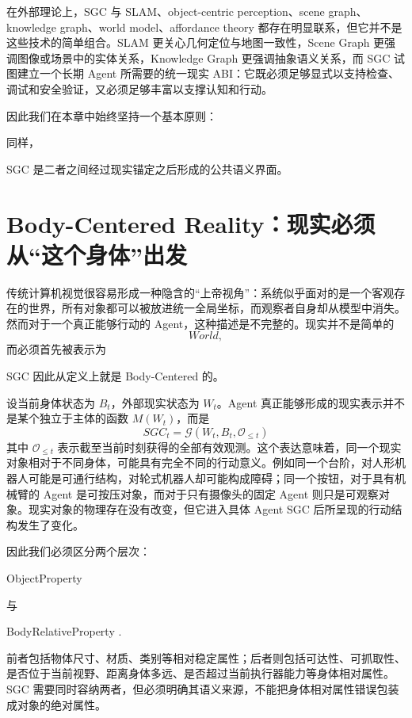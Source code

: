 在外部理论上，SGC 与 SLAM、object-centric perception、scene graph、knowledge graph、world model、affordance theory 都存在明显联系，但它并不是这些技术的简单组合。SLAM 更关心几何定位与地图一致性，Scene Graph 更强调图像或场景中的实体关系，Knowledge Graph 更强调抽象语义关系，而 SGC 试图建立一个长期 Agent 所需要的统一现实 ABI：它既必须足够显式以支持检查、调试和安全验证，又必须足够丰富以支撑认知和行动。

因此我们在本章中始终坚持一个基本原则：
\begin{statementbox}
\centering
{}
\end{statementbox}
同样，
\begin{statementbox}
\centering
{}
\end{statementbox}
SGC 是二者之间经过现实锚定之后形成的公共语义界面。

\section{Body-Centered Reality：现实必须从“这个身体”出发}

传统计算机视觉很容易形成一种隐含的“上帝视角”：系统似乎面对的是一个客观存在的世界，所有对象都可以被放进统一全局坐标，而观察者自身却从模型中消失。然而对于一个真正能够行动的 Agent，这种描述是不完整的。现实并不是简单的
\[
World ,
\]
而必须首先被表示为
\begin{statementbox}
\centering
{}
\end{statementbox}
SGC 因此从定义上就是 Body-Centered 的。

设当前身体状态为 $B_t$，外部现实状态为 $W_t$。Agent 真正能够形成的现实表示并不是某个独立于主体的函数 $M(W_t)$，而是
\[
\boxed{
SGC_t
=
\mathcal G(W_t,B_t,\mathcal O_{\leq t})
}
\]
其中 $\mathcal O_{\leq t}$ 表示截至当前时刻获得的全部有效观测。这个表达意味着，同一个现实对象相对于不同身体，可能具有完全不同的行动意义。例如同一个台阶，对人形机器人可能是可通行结构，对轮式机器人却可能构成障碍；同一个按钮，对于具有机械臂的 Agent 是可按压对象，而对于只有摄像头的固定 Agent 则只是可观察对象。现实对象的物理存在没有改变，但它进入具体 Agent SGC 后所呈现的行动结构发生了变化。

因此我们必须区分两个层次：
\begin{statementbox}
ObjectProperty
\end{statementbox}
与
\begin{statementbox}
BodyRelativeProperty .
\end{statementbox}
前者包括物体尺寸、材质、类别等相对稳定属性；后者则包括可达性、可抓取性、是否位于当前视野、距离身体多远、是否超过当前执行器能力等身体相对属性。SGC 需要同时容纳两者，但必须明确其语义来源，不能把身体相对属性错误包装成对象的绝对属性。

